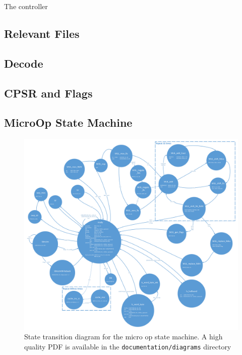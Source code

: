 \label{sec:c}
The controller

\subsection{Relevant Files}

\subsection{Decode}

\subsection{CPSR and Flags}

\subsection{MicroOp State Machine}


\begin{figure}[h!]
\centering
\includegraphics[width=\textwidth]{./diagrams/micropfsm_drawing.pdf}
\caption{State transition diagram for the micro op state machine. A high quality PDF is available in the \texttt{documentation/diagrams} directory}
\label{fig:uopdiagram}
\end{figure}
